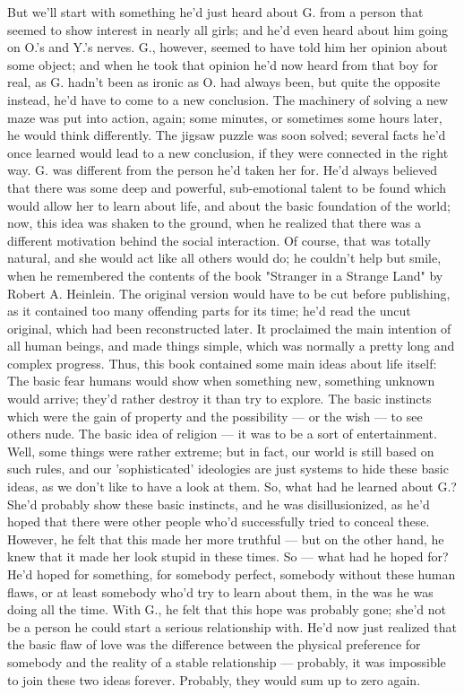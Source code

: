 But we'll start with something he'd just heard about G. from a person that seemed to show interest in nearly all girls; and he'd even heard about him going on O.'s and Y.'s nerves. G., however, seemed to have told him her opinion about some object; and when he took that opinion he'd now heard from that boy for real, as G. hadn't been as ironic as O. had always been, but quite the opposite instead, he'd have to come to a new conclusion. The machinery of solving a new maze was put into action, again; some minutes, or sometimes some hours later, he would think differently. The jigsaw puzzle was soon solved; several facts he'd once learned would lead to a new conclusion, if they were connected in the right way. G. was different from the person he'd taken her for. He'd always believed that there was some deep and powerful, sub-emotional talent to be found which would allow her to learn about life, and about the basic foundation of the world; now, this idea was shaken to the ground, when he realized that there was a different motivation behind the social interaction. Of course, that was totally natural, and she would act like all others would do; he couldn't help but smile, when he remembered the contents of the book "Stranger in a Strange Land" by Robert A. Heinlein. The original version would have to be cut before publishing, as it contained too many offending parts for its time; he'd read the uncut original, which had been reconstructed later. It proclaimed the main intention of all human beings, and made things simple, which was normally a pretty long and complex progress. Thus, this book contained some main ideas about life itself: 
The basic fear humans would show when something new, something unknown would arrive; they'd rather destroy it than try to explore. 
The basic instincts which were the gain of property and the possibility --- or the wish --- to see others nude. 
The basic idea of religion --- it was to be a sort of entertainment. 
Well, some things were rather extreme; but in fact, our world is still based on such rules, and our 'sophisticated' ideologies are just systems to hide these basic ideas, as we don't like to have a look at them. So, what had he learned about G.? She'd probably show these basic instincts, and he was disillusionized, as he'd hoped that there were other people who'd successfully tried to conceal these. However, he felt that this made her more truthful --- but on the other hand, he knew that it made her look stupid in these times. 
So --- what had he hoped for? He'd hoped for something, for somebody perfect, somebody without these human flaws, or at least somebody who'd try to learn about them, in the was he was doing all the time. With G., he felt that this hope was probably gone; she'd not be a person he could start a serious relationship with. He'd now just realized that the basic flaw of love was the difference between the physical preference for somebody and the reality of a stable relationship --- probably, it was impossible to join these two ideas forever. Probably, they would sum up to zero again. 
